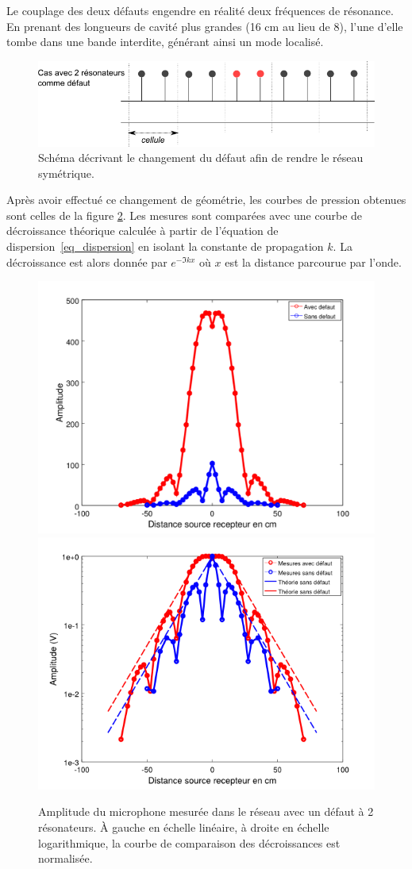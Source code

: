 Le couplage des deux défauts engendre en réalité deux fréquences de résonance. En prenant des longueurs de cavité plus grandes (16 cm au lieu de 8), l'une d'elle tombe dans une bande interdite, générant ainsi un mode localisé.

\begin{figure}[!h]
\centering
\includegraphics[scale=0.5]{./images_chp3/chgmt_defaut2.png}
\caption{\label{fig_exp} Schéma décrivant le changement du défaut afin de rendre le réseau symétrique.}
\end{figure}



Après avoir effectué ce changement de géométrie, les courbes de pression obtenues sont celles de la figure \ref{p_tube2}.
Les mesures sont comparées avec une courbe de décroissance théorique calculée à partir de l'équation de dispersion~\ref{eq_dispersion} en isolant la constante de propagation $k$. La décroissance est alors donnée par $e^{-\Im{k}x}$ où $x$ est la distance parcourue par l'onde.

\begin{figure}[!h]
\centering
\includegraphics[width=0.5 \textwidth]{./images_chp3/comparaison_decroissance_lin.png}\hfill
\includegraphics[width=0.5 \textwidth]{./images_chp3/comparaison_decroissance_log_theo.png}
\caption{\label{p_tube2} Amplitude du microphone mesurée dans le réseau avec un défaut à 2 résonateurs. À gauche en échelle linéaire, à droite en échelle logarithmique, la courbe de comparaison des décroissances est normalisée.}
\end{figure}

